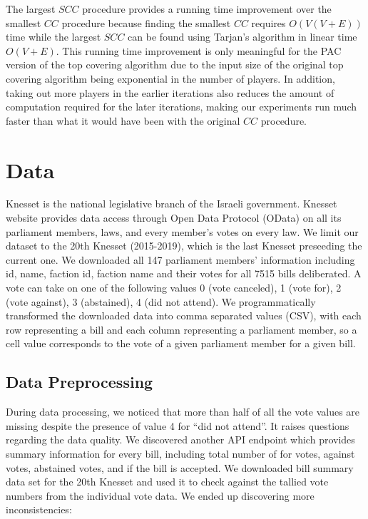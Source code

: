 \documentclass[letterpaper]{article} %
\begin{document}
The largest $SCC$ procedure provides a running time improvement over the smallest $CC$ procedure because finding the smallest $CC$ requires $O(V(V + E))$ time while the largest $SCC$ can be found using Tarjan's algorithm in linear time $O(V + E)$\cite{Tarjan72depthfirst}. This running time improvement is only meaningful for the PAC version of the top covering algorithm due to the input size of the original top covering algorithm being exponential in the number of players. In addition, taking out more players in the earlier iterations also reduces the amount of computation required for the later iterations, making our experiments run much faster than what it would have been with the original $CC$ procedure.

\section{Data}
Knesset is the national legislative branch of the Israeli government. Knesset website provides data access through Open Data Protocol (OData) on all its parliament members, laws, and every member's votes on every law. We limit our dataset to the 20th Knesset (2015-2019), which is the last Knesset preseeding the current one. We downloaded all 147 parliament members' information including id, name, faction id, faction name and their votes for all 7515 bills deliberated. A vote can take on one of the following values 0 (vote canceled), 1 (vote for), 2 (vote against), 3 (abstained), 4 (did not attend). We programmatically transformed the downloaded data into comma separated values (CSV), with each row representing a bill and each column representing a parliament member, so a cell value corresponds to the vote of a given parliament member for a given bill.

\subsection{Data Preprocessing}
During data processing, we noticed that more than half of all the vote values are missing despite the presence of value 4 for ``did not attend''. It raises questions regarding the data quality. We discovered another API endpoint which provides summary information for every bill, including total number of for votes, against votes, abstained votes, and if the bill is accepted. We downloaded bill summary data set for the 20th Knesset and used it to check against the tallied vote numbers from the individual vote data. We ended up discovering more inconsistencies:
\end{document}
